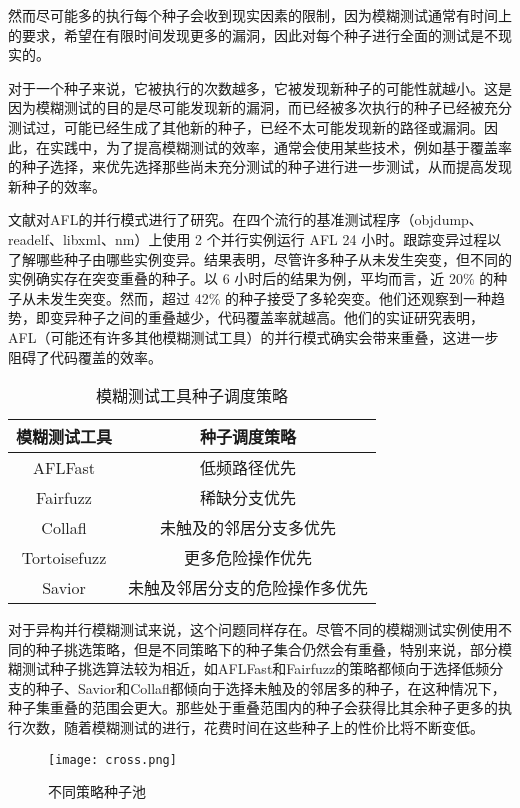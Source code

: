 \documentclass[master]{thesis-uestc}
\begin{document}
然而尽可能多的执行每个种子会收到现实因素的限制，因为模糊测试通常有时间上的要求，希望在有限时间发现更多的漏洞，因此对每个种子进行全面的测试是不现实的。

对于一个种子来说，它被执行的次数越多，它被发现新种子的可能性就越小。这是因为模糊测试的目的是尽可能发现新的漏洞，而已经被多次执行的种子已经被充分测试过，可能已经生成了其他新的种子，已经不太可能发现新的路径或漏洞。因此，在实践中，为了提高模糊测试的效率，通常会使用某些技术，例如基于覆盖率的种子选择，来优先选择那些尚未充分测试的种子进行进一步测试，从而提高发现新种子的效率。

文献\cite{wang2021facilitating}对AFL的并行模式进行了研究。在四个流行的基准测试程序（objdump、readelf、libxml、nm）上使用 2 个并行实例运行 AFL 24 小时。跟踪变异过程以了解哪些种子由哪些实例变异。结果表明，尽管许多种子从未发生突变，但不同的实例确实存在突变重叠的种子。以 6 小时后的结果为例，平均而言，近 20\% 的种子从未发生突变。然而，超过 42\% 的种子接受了多轮突变。他们还观察到一种趋势，即变异种子之间的重叠越少，代码覆盖率就越高。他们的实证研究表明，AFL（可能还有许多其他模糊测试工具）的并行模式确实会带来重叠，这进一步阻碍了代码覆盖的效率。

\begin{table}[!htbp]
    \caption{模糊测试工具种子调度策略}
    \begin{tabular}{cc}
    \toprule
    模糊测试工具 & 种子调度策略 \\
    \midrule
    AFLFast & 低频路径优先 \\
    Fairfuzz & 稀缺分支优先 \\
    Collafl &  未触及的邻居分支多优先 \\
    Tortoisefuzz & 更多危险操作优先 \\
    Savior & 未触及邻居分支的危险操作多优先 \\
    \bottomrule
    \end{tabular}
    \label{table_seeds}
    \vspace{6pt}
\end{table}

对于异构并行模糊测试来说，这个问题同样存在。尽管不同的模糊测试实例使用不同的种子挑选策略，但是不同策略下的种子集合仍然会有重叠，特别来说，部分模糊测试种子挑选算法较为相近，如AFLFast和Fairfuzz的策略都倾向于选择低频分支的种子、Savior和Collafl都倾向于选择未触及的邻居多的种子，在这种情况下，种子集重叠的范围会更大。那些处于重叠范围内的种子会获得比其余种子更多的执行次数，随着模糊测试的进行，花费时间在这些种子上的性价比将不断变低。

\begin{figure}[!htbp]
    \vspace{6pt}
    \centering
    \texttt{[image: cross.png]}
    \caption{不同策略种子池}
    \label{celue}
\end{figure}
\end{document}
